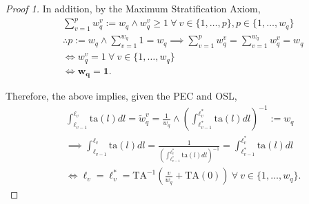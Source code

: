\documentclass[hidelinks, nonatbib]{elsarticle}
\begin{document}
\begin{lemma}
\begin{proof}[Proof 1]
        In addition, by the Maximum Stratification Axiom,
        \begin{align}
            &
            \sum_{v=1}^{p}{
                w_{q}^{v}
            }
            := 
            w_q
            \land
            w_{q}^{v} 
            \geq 
            1
            \
            \forall
            \
            v \in \{1, \dots, p\},
            p \in \{1, \dots, w_q\}
            \\
            &
            \therefore
            p := w_q
            \land
            \sum_{v=1}^{w_q}
            1
            =
            w_q
            \implies
            \sum_{v=1}^{p}{
                w_{q}^{v}
            }
            =
            \sum_{v=1}^{w_q}{
                w_{q}^{v}
            }
            =
            w_q
            \\
            &
            \iff
            w_{q}^{v}
            =
            1
            \
            \forall
            \
            v \in \{1, \dots, w_q\}
            \\
            &
            \iff
            \boldsymbol{w_q} =
            \boldsymbol{1}
            .
            \end{align}
            
        Therefore, the above implies, given the PEC and OSL,
        \begin{align}
        &
        \int_{\ell_{v-1}}^{\ell_{v}}{
            \text{ta}(l)
            dl
        }
        =
        \tilde{w}_{q}^{v} =
        \frac{1}{w_q}
        \land
        \left(
            \int_{
                \ell_{v-1}^{*}
            }^{
                \ell_{v}^{*}    
            }{
                \text{ta}(l)
                dl
            }
        \right) ^ {-1}
        :=
        w_q
        \\
        &
        \implies
        \int_{\ell_{v-1}}^{\ell_{v}}{
            \text{ta}(l)
            dl
        }
        =
        \frac{1}{
            \left(
                \int_{
                    \ell_{v-1}^{*}
                }^{
                    \ell_{v}^{*}    
                }{
                    \text{ta}(l)
                    dl
                }
            \right) ^ {-1}
        }
        =
        \int_{
            \ell_{v-1}^{*}
        }^{
            \ell_{v}^{*}    
        }{
            \text{ta}(l)
            dl
        }
        \\
        &
        \iff
        \ell_{v}
        =
        \ell_{v}^{*}
        =
        \text{TA}^{-1}\left(
            \frac{v}{w_q}
            +
            \text{TA}(0)
        \right)
        \
        \forall
        \
        v \in \{1, \dots, w_q\}
        .
        \end{align}
    \end{proof}
    

\end{lemma}
\end{document}
